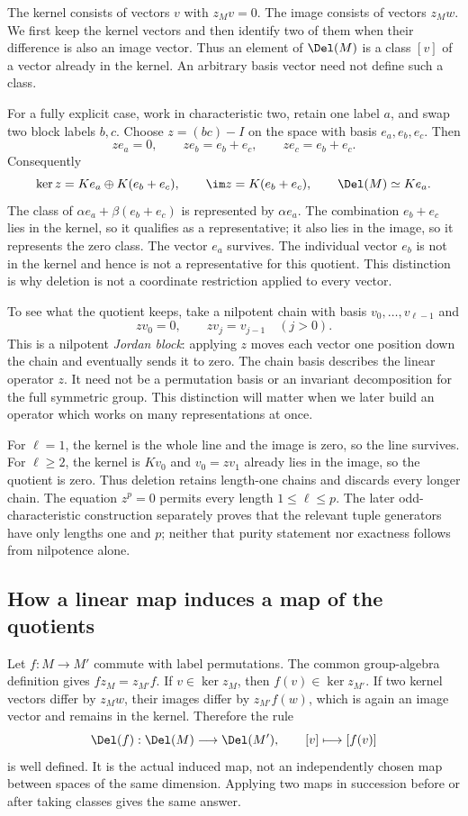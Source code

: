 The kernel consists of vectors $v$ with $z_Mv=0$. The image
consists of vectors $z_Mw$. We first keep the kernel vectors and
then identify two of them when their difference is also an image
vector. Thus an element of $\Del(M)$ is a class $[v]$ of a vector
already in the kernel. An arbitrary basis vector need not define
such a class.

For a fully explicit case, work in characteristic two, retain one
label $a$, and swap two block labels $b,c$. Choose
$z=(bc)-I$ on the space with basis $e_a,e_b,e_c$. Then
\[
 ze_a=0,\qquad ze_b=e_b+e_c,\qquad ze_c=e_b+e_c.
\]
Consequently
\[
 \ker z=K e_a\oplus K(e_b+e_c),\qquad
 \im z=K(e_b+e_c),\qquad \Del(M)\simeq K e_a.
\]
The class of $\alpha e_a+\beta(e_b+e_c)$ is represented by
$\alpha e_a$. The combination $e_b+e_c$ lies in the kernel,
so it qualifies as a representative; it also lies in the image,
so it represents the zero class.
The vector $e_a$ survives. The individual vector $e_b$ is not in
the kernel and hence is not a representative for this quotient.
This distinction is why deletion is not a coordinate restriction
applied to every vector.

To see what the quotient keeps, take a nilpotent chain with basis
$v_0,\ldots,v_{\ell-1}$ and
\[
                  zv_0=0,\qquad zv_j=v_{j-1}\quad(j>0).
\]
This is a nilpotent \emph{Jordan block}: applying $z$ moves each vector
one position down the chain and eventually sends it to zero.
The chain basis describes the linear operator $z$. It need not be a
permutation basis or an invariant decomposition for the full symmetric
group. This distinction will matter when we later build an operator
which works on many representations at once.

For $\ell=1$, the kernel is the whole line and the image is zero,
so the line survives. For $\ell\ge2$, the kernel is $Kv_0$ and
$v_0=zv_1$ already lies in the image, so the quotient is zero.
Thus deletion retains length-one chains and discards every longer chain.
The equation $z^p=0$ permits every length $1\le\ell\le p$.
The later odd-characteristic construction separately proves that the
relevant tuple generators have only lengths one and $p$; neither that
purity statement nor exactness follows from nilpotence alone.

\subsection*{How a linear map induces a map of the quotients}
Let $f:M\to M'$ commute with label permutations. The common
group-algebra definition gives $f z_M=z_{M'}f$. If $v\in\ker z_M$,
then $f(v)\in\ker z_{M'}$. If two kernel vectors differ by
$z_Mw$, their images differ by $z_{M'}f(w)$, which is again an
image vector and remains in the kernel. Therefore the rule
\[
                  \Del(f):\Del(M)\longrightarrow\Del(M'),
                              \qquad[v]\longmapsto[f(v)]
\]
is well defined. It is the actual induced map, not an independently
chosen map between spaces of the same dimension. Applying two maps
in succession before or after taking classes gives the same answer.

